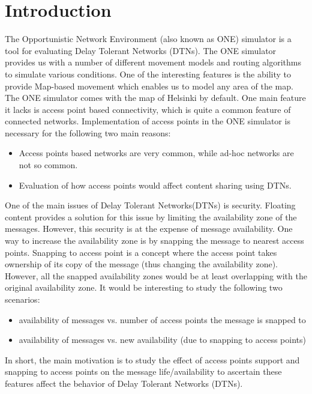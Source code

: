 
\chapter{Introduction}\label{chapter:introduction}

The Opportunistic Network Environment (also known as ONE) simulator is a tool for evaluating Delay Tolerant Networks (DTNs). The ONE simulator provides us with a number of different movement models and routing algorithms to simulate various conditions. One of the interesting features is the ability to provide Map-based movement which enables us to model any area of the map. The ONE simulator comes with the map of Helsinki by default. One main feature it lacks is access point based connectivity, which is quite a common feature of connected networks. Implementation of access points in the ONE simulator is necessary for the following two main reasons:

\begin{itemize}
  \item Access points based networks are very common, while ad-hoc networks are not so common.
  \item Evaluation of how access points would affect content sharing using DTNs.
\end{itemize}

One of the main issues of Delay Tolerant Networks(DTNs) is security. Floating content provides a solution for this issue by limiting the availability zone of the messages. However, this security is at the expense of message availability. One way to increase the availability zone is by snapping the message to nearest access points. Snapping to access point is a concept where the access point takes ownership of its copy of the message (thus changing the availability zone). However, all the snapped availability zones would be at least overlapping with the original availability zone. It would be interesting to study the following two scenarios:
\begin{itemize}
  \item availability of messages vs. number of access points the message is snapped to
  \item availability of messages vs. new availability (due to snapping to access points)
\end{itemize}

In short, the main motivation is to study the effect of access points support and snapping to access points on the message life/availability to ascertain these features affect the behavior of Delay Tolerant Networks (DTNs).
\newpage
